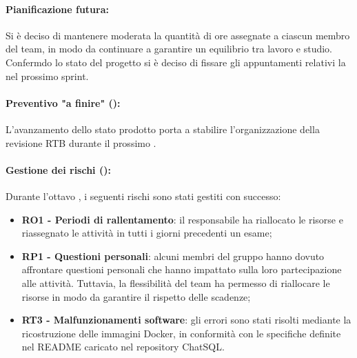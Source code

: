 \paragraph*{Pianificazione futura:}
\par Si è deciso di mantenere moderata la quantità di ore assegnate a ciascun membro del team, in modo da continuare a garantire un equilibrio tra lavoro e studio. Confermdo lo stato del progetto si è deciso di fissare gli appuntamenti relativi la  nel prossimo sprint.

\paragraph*{Preventivo "a finire" ():}
\par L'avanzamento dello stato prodotto porta a stabilire l'organizzazione della revisione RTB durante il prossimo .

\paragraph*{Gestione dei rischi ():}
\vspace{0.5\baselineskip}
\par Durante l'ottavo , i seguenti rischi sono stati gestiti con successo:
\begin{itemize}
  \item \textbf{RO1 - Periodi di rallentamento}: il responsabile ha riallocato le risorse e riassegnato le attività in tutti i giorni precedenti un esame;
  \item \textbf{RP1 - Questioni personali}: alcuni membri del gruppo hanno dovuto affrontare questioni personali che hanno impattato sulla loro partecipazione alle attività. Tuttavia, la flessibilità del team ha permesso di riallocare le risorse in modo da garantire il rispetto delle scadenze;
  \item \textbf{RT3 - Malfunzionamenti software}: gli errori sono stati risolti mediante la ricostruzione delle immagini Docker, in conformità con le specifiche definite nel README caricato nel repository ChatSQL.
\end{itemize}

